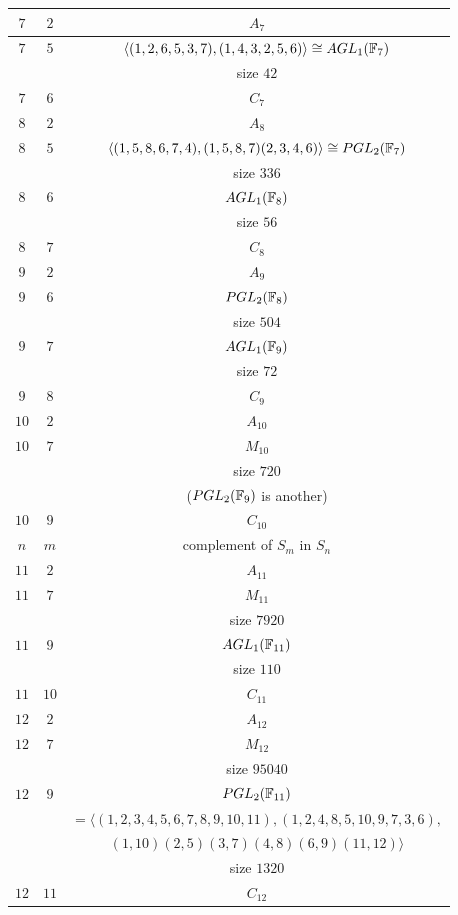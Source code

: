 \begin{center}
\begin{tabular}{|c|c|c|} \hline
$7$ & $2$ & $A_7$\\ \hline
$7$ & $5$ & $\langle (1,2,6,5,3,7),(1,4,3,2,5,6)\rangle 
\cong AGL_1({{\Bbb F}}_7)$ \\
 & & size $42$\\ \hline
$7$ & $6$ & $C_7$\\ \hline
$8$ & $2$ & $A_8$\\ \hline

$8$ & $5$ & $\langle (1,5,8,6,7,4),(1,5,8,7)(2,3,4,6)\rangle 
\cong PGL_2({{\Bbb F}}_7)$ \\
 & & size $336$\\ \hline
$8$ & $6$ & $AGL_1({{\Bbb F}}_8)$ \\
 & & size $56$\\ \hline
$8$ & $7$ & $C_8$\\ \hline
$9$ & $2$ & $A_9$\\ \hline
$9$ & $6$ & $PGL_2({{\Bbb F}}_8)$ \\
 & & size $504$\\ \hline
$9$ & $7$ & $AGL_1({{\Bbb F}}_9)$ \\
 & & size $72$\\ \hline
$9$ & $8$ & $C_9$\\ \hline
$10$ & $2$ & $A_{10}$\\ \hline
$10$ & $7$ & $M_{10}$ \\
 & & size $720$\\ 
 & & ($PGL_2({{\Bbb F}}_9)$ is another) \\ \hline
$10$ & $9$ & $C_{10}$\\ \hline

$n$ & $m$ & complement of $S_m$ in $S_n$ \\ \hline

$11$ & $2$ & $A_{11}$\\ \hline
$11$ & $7$ & $M_{11}$ \\
 & & size $7920$\\ \hline
$11$ & $9$ & $AGL_1({{\Bbb F}}_{11})$ \\
 & & size $110$\\ \hline
$11$ & $10$ & $C_{11}$\\ \hline
$12$ & $2$ & $A_{12}$\\ \hline
$12$ & $7$ & $M_{12}$ \\
 & & size $95040$\\ \hline
$12$ & $9$ & $ PGL_2({{\Bbb F}}_{11})$ \\
 & & $=\langle (1,2,3,4,5,6,7,8,9,10,11),
(1,2,4,8,5,10,9,7,3,6),$\\
 & & $(1,10)(2,5)(3,7)(4,8)(6,9)(11,12)\rangle $ \\
 & & size $1320$\\ \hline
$12$ & $11$ & $C_{12}$\\ \hline
\end{tabular}
\end{center}

